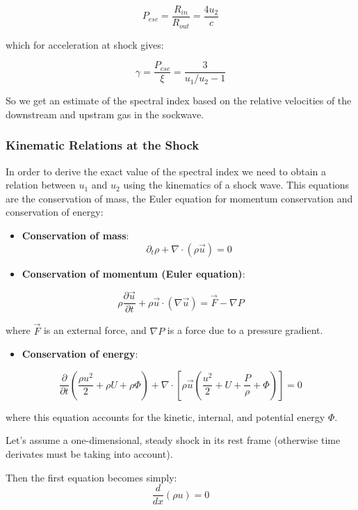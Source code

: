 \documentclass[
  letterpaper,
  DIV=11,
  numbers=noendperiod]{scrreprt}
\providecommand{\tightlist}{%
  \setlength{\itemsep}{0pt}\setlength{\parskip}{0pt}}\usepackage{longtable,booktabs,array}
\begin{document}
\[P_{esc} = \frac{R_{in} }{R_{out} }= \frac{4 u_2}{c}\]

which for acceleration at shock gives:

\[\gamma = \frac{P_{esc}}{\xi} = \frac{3}{u_1/u_2 -1}\]

So we get an estimate of the spectral index based on the relative
velocities of the downstream and upstram gas in the sockwave.

\subsubsection*{Kinematic Relations at the
Shock}\label{kinematic-relations-at-the-shock}

In order to derive the exact value of the spectral index we need to
obtain a relation between \(u_1\) and \(u_2\) using the kinematics of a
shock wave. This equations are the conservation of mass, the Euler
equation for momentum conservation and conservation of energy:

\begin{itemize}
\item
  \textbf{Conservation of mass}:
  \[\partial_t \rho + \nabla \cdot (\rho\vec{u}) = 0\]
\item
  \textbf{Conservation of momentum (Euler equation)}:
\end{itemize}

\[\rho\frac{\partial \vec{u}}{\partial t} + \rho \vec{u} \cdot(\nabla\vec{u}) = \vec{F} - \nabla P\]

where \(\vec{F}\) is an external force, and \(\nabla P\) is a force due
to a pressure gradient.

\begin{itemize}
\tightlist
\item
  \textbf{Conservation of energy}:
\end{itemize}

\[\frac{\partial}{\partial t} \left(\frac{\rho u^2}{2} + \rho U + \rho\Phi\right) + \nabla\cdot\left[\rho \vec{u}\left(\frac{u^2}{2} + U + \frac{P}{\rho} + \Phi\right)\right] = 0 \]

where this equation accounts for the kinetic, internal, and potential
energy \(\Phi\).

Let's assume a one-dimensional, steady shock in its rest frame
(otherwise time derivates must be taking into account).

Then the first equation becomes simply: \[\frac{d}{dx} (\rho u) = 0\]
\end{document}
